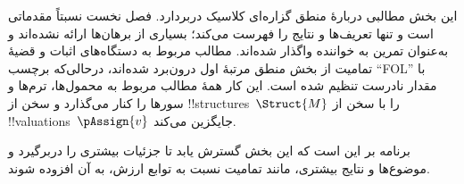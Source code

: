 \documentclass[../../include/open-logic-part]{subfiles}
\begin{document}

\begin{editorial}
  این بخش مطالبی دربارهٔ منطق گزاره‌ای کلاسیک دربردارد. فصل نخست نسبتاً
  مقدماتی است و تنها تعریف‌ها و نتایج را فهرست می‌کند؛ بسیاری از برهان‌ها
  ارائه نشده‌اند و به‌عنوان تمرین به خواننده واگذار شده‌اند. مطالب مربوط به
  دستگاه‌های اثبات و قضیهٔ تمامیت از بخش منطق مرتبهٔ اول درون‌برد شده‌اند،
  درحالی‌که برچسب ``FOL'' با مقدار نادرست تنظیم شده است. این کار همهٔ مطالب
  مربوط به محمول‌ها، ترم‌ها و سورها را کنار می‌گذارد و سخن از
  !!{structure}s~$\Struct{M}$ را با سخن از
  !!{valuation}s~$\pAssign{v}$ جایگزین می‌کند.

  برنامه بر این است که این بخش گسترش یابد تا جزئیات بیشتری را دربرگیرد و
  موضوع‌ها و نتایج بیشتری، مانند تمامیت نسبت به توابع ارزش، به آن افزوده
  شوند.
\end{editorial}










\OLEndPartHook
\end{document}
